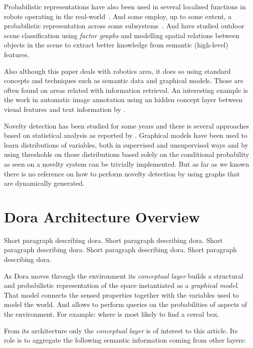 \documentclass[runningheads,a4paper]{llncs}
\begin{document}
Probabilistic representations have also been used in several localised functions
in robots operating in the real-world~\cite{gross2009toomas,maierprobabilistic}.
And some employ, up to some extent, a probabilistic representation across some
subsystems~\cite{kraft2008exploration}.
And \cite{boutell2006factor} have studied outdoor scene classification using
\emph{factor graphs} and modelling spatial relations between objects in the scene
to extract better knowledge from semantic (high-level) features.

Also although this paper deals with robotics area, it does so
using standard concepts and techniques such as semantic data and graphical models.
Those are often found on areas related with information retrieval.
An interesting example is the work in automatic image annotation using an hidden
concept layer between visual features and text information by \cite{zhang2005probabilistic}.

Novelty detection has been studied for some years and there is several approaches
based on statistical analysis as reported by \cite{markou2003novelty}.
Graphical models have been used to learn distributions of variables, both in
supervised and unsupervised ways and by using thresholds on those distributions
based solely on the conditional probability as seen on \cite{bishop1994novelty}
a novelty system can be trivially implemented.
But as far as we known there is no reference on how to perform novelty detection
by using graphs that are dynamically generated.


\section{Dora Architecture Overview}
Short paragraph describing dora. Short paragraph describing dora. Short paragraph describing dora. Short paragraph describing dora. Short paragraph describing dora.

As Dora moves through the environment its \emph{conceptual layer} builds a structural and
probabilistic representation of the space instantiated as a \emph{graphical model}.
That model connects the sensed properties together with the variables used to model the world.
And allows to perform queries on the probabilities of aspects of the environment.
For example: where is most likely to find a cereal box\cite{exploiting}.

From its architecture only the \emph{conceptual layer} is of interest to this article.
Its role is to aggregate the following semantic information coming from other layers:
\end{document}
